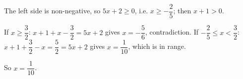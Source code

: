 The left side is non-negative, so $5x+2\ge0$, i.e. $x\ge-\dfrac25$; then $x+1>0$.

If $x\ge\dfrac32$: $x+1+x-\dfrac32=5x+2$ gives $x=-\dfrac56$, contradiction.
If $-\dfrac25\le x<\dfrac32$: $x+1+\dfrac32-x=\dfrac52=5x+2$ gives $x=\dfrac1{10}$, which is in range.

So $x=\boxed{\dfrac1{10}}$.
